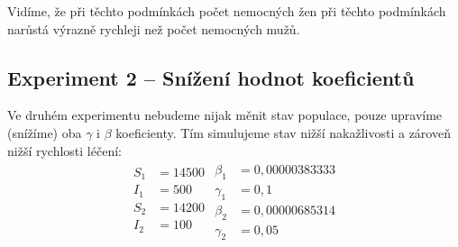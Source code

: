 \documentclass{article}
\begin{document}
Vidíme, že při těchto podmínkách počet nemocných žen při těchto podmínkách narůstá výrazně rychleji než počet nemocných mužů.
\newpage

\subsection{Experiment 2 -- Snížení hodnot koeficientů}
Ve druhém experimentu nebudeme nijak měnit stav populace, pouze upravíme (snížíme) oba $\gamma$ i $\beta$ koeficienty. Tím simulujeme stav nižší nakažlivosti a zároveň nižší rychlosti léčení:
\begin{align}
\begin{split}
    S_1&=14500\\
    I_1&=500\\
    S_2&=14200\\
    I_2&=100\\
\end{split}
\begin{split}
    \beta_1&=0,00000383333\\
    \gamma_1&=0,1\\
    \beta_2&=0,00000685314\\
    \gamma_2&=0,05\nonumber
\end{split}
\end{align}
\end{document}

